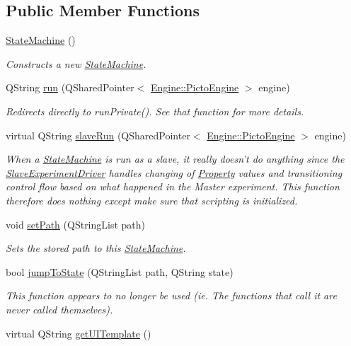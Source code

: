 \subsection*{Public Member Functions}
\begin{DoxyCompactItemize}
\item 
\hyperlink{class_picto_1_1_state_machine_abdc01cf5d156f7611381db0e06e48ad9}{State\-Machine} ()
\begin{DoxyCompactList}\small\item\em Constructs a new \hyperlink{class_picto_1_1_state_machine}{State\-Machine}. \end{DoxyCompactList}\item 
Q\-String \hyperlink{class_picto_1_1_state_machine_ae627a569715e852af85cff71d5e64e1e}{run} (Q\-Shared\-Pointer$<$ \hyperlink{class_picto_1_1_engine_1_1_picto_engine}{Engine\-::\-Picto\-Engine} $>$ engine)
\begin{DoxyCompactList}\small\item\em Redirects directly to run\-Private(). See that function for more details. \end{DoxyCompactList}\item 
virtual Q\-String \hyperlink{class_picto_1_1_state_machine_a6af8e4f88e7ea89a85e415e5c2a117fb}{slave\-Run} (Q\-Shared\-Pointer$<$ \hyperlink{class_picto_1_1_engine_1_1_picto_engine}{Engine\-::\-Picto\-Engine} $>$ engine)
\begin{DoxyCompactList}\small\item\em When a \hyperlink{class_picto_1_1_state_machine}{State\-Machine} is run as a slave, it really doesn't do anything since the \hyperlink{class_picto_1_1_slave_experiment_driver}{Slave\-Experiment\-Driver} handles changing of \hyperlink{class_picto_1_1_property}{Property} values and transitioning control flow based on what happened in the Master experiment. This function therefore does nothing except make sure that scripting is initialized. \end{DoxyCompactList}\item 
void \hyperlink{class_picto_1_1_state_machine_a677501d0b881f617e9e8b7f87afcc908}{set\-Path} (Q\-String\-List path)
\begin{DoxyCompactList}\small\item\em Sets the stored path to this \hyperlink{class_picto_1_1_state_machine}{State\-Machine}. \end{DoxyCompactList}\item 
bool \hyperlink{class_picto_1_1_state_machine_a350b2df2e138a726c349eb3286928dbe}{jump\-To\-State} (Q\-String\-List path, Q\-String state)
\begin{DoxyCompactList}\small\item\em This function appears to no longer be used (ie. The functions that call it are never called themselves). \end{DoxyCompactList}\item 
\hypertarget{class_picto_1_1_state_machine_a8f913876907151154a0f69c2dce3fa4f}{virtual Q\-String \hyperlink{class_picto_1_1_state_machine_a8f913876907151154a0f69c2dce3fa4f}{get\-U\-I\-Template} ()}\label{class_picto_1_1_state_machine_a8f913876907151154a0f69c2dce3fa4f}


\end{DoxyCompactItemize}
